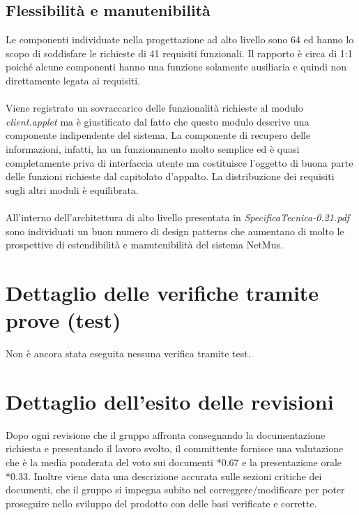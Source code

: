 \subsection*{Flessibilit\`a e manutenibilit\`a}
Le componenti individuate nella progettazione ad alto livello sono 64 ed hanno
lo scopo di soddisfare le richieste di 41 requisiti funzionali. Il rapporto \`e
circa di 1:1 poich\'e alcune componenti hanno una funzione solamente ausiliaria e
quindi non direttamente legata ai requisiti. \\\\
Viene registrato un sovraccarico delle funzionalit\`a richieste al modulo
\emph{client.applet} ma \`e giustificato dal fatto che questo modulo descrive
una componente indipendente del sistema. La componente di recupero delle
informazioni, infatti, ha un funzionamento molto semplice ed \`e quasi
completamente priva di interfaccia utente ma costituisce l'oggetto di buona
parte delle funzioni richieste dal capitolato d'appalto. La distribuzione dei
requisiti sugli altri moduli \`e equilibrata.\\\\
All'interno dell'architettura di alto livello presentata in
\emph{SpecificaTecnica-0.21.pdf} sono individuati un buon numero di design
patterns che aumentano di molto le prospettive di estendibilit\`a e manutenibilit\`a
del sistema NetMus.

\section{Dettaglio delle verifiche tramite prove (test)}
Non \`e ancora stata eseguita nessuna verifica tramite test.

\section{Dettaglio dell'esito delle revisioni}
Dopo ogni revisione che il gruppo affronta consegnando la documentazione
richiesta e presentando il lavoro svolto, il committente fornisce una
valutazione che \`e la media ponderata del voto sui documenti *0.67 e la
presentazione orale *0.33. Inoltre viene data una descrizione accurata
sulle sezioni critiche dei documenti, che il gruppo si impegna subito
nel correggere/modificare per poter proseguire nello sviluppo del prodotto con delle
basi verificate e corrette.


